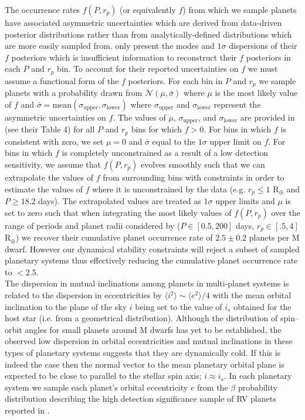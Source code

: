 The occurrence rates $f(P,r_p)$ (or equivalently $f$) from which we sample planets have
associated asymmetric uncertainties which are derived from data-driven posterior distributions
rather than from analytically-defined distributions which are more easily sampled from. \cite{dressing15a}
only present the modes and $1\sigma$ dispersions of their $f$ posteriors which is insufficient information
to reconstruct their $f$ posteriors in each $P$ and $r_p$ bin. To account for their reported uncertainties on
$f$ we must assume a functional form of the $f$ posteriors.
For each bin in $P$ and $r_p$ we sample planets with a probability drawn
from $\mathcal{N}(\mu, \bar{\sigma})$ where $\mu$ is the most likely value
of $f$ and $\bar{\sigma} = \text{mean}(\sigma_{\text{upper}},\sigma_{\text{lower}})$ where
$\sigma_{\text{upper}}$ and $\sigma_{\text{lower}}$ represent the asymmetric uncertainties on $f$.
The values of $\mu$, $\sigma_{\text{upper}}$, and $\sigma_{\text{lower}}$ are provided in \cite{dressing15a}
(see their Table 4) for all $P$ and $r_p$ bins for which $f>0$. For bins in which $f$ is consistent with zero,
we set $\mu=0$ and $\bar{\sigma}$ equal to the $1\sigma$ upper limit on $f$. For bins in
which $f$ is completely unconstrained as a result of a low detection sensitivity, we assume that $f(P,r_p)$ 
evolves smoothly such that we can extrapolate the values of $f$ from surrounding
bins with constraints in order to estimate the values of $f$ where it is unconstrained by the data
(e.g. $r_p \leq 1$ R$_{\oplus}$ and $P \geq 18.2$ days).
The extrapolated values are treated as $1\sigma$ upper limits and $\mu$ is set to zero such that when
integrating the most likely values of
$f(P,r_p)$ over the range of periods and planet radii considered by \citealt{dressing15a} ($P \in [0.5,200]$ days,
$r_p \in [.5,4]$ R$_{\oplus}$) we recover their cumulative
planet occurrence rate of $2.5 \pm 0.2$ planets per M dwarf. However our dynamical stability constraints will
reject a subset of sampled planetary systems thus effectively reducing the cumulative planet occurrence rate to
$<2.5$. \\

The dispersion in mutual inclinations among planets in multi-planet 
systems is related to the dispersion in eccentricities by $\langle i^2 \rangle \sim \langle e^2 \rangle /4$ 
\citep{stewart00, quillen07} with the mean orbital inclination 
to the plane of the sky $i$ being set to the value of $i_s$ obtained for the host star (i.e. from a geometrical
distribution). Although the distribution of spin--orbit angles for small planets around
M dwarfs has yet to be established, the observed low dispersion in orbital eccentricities \citep{vaneylen15}
and mutual inclinations \citep{figueira12, fabrycky14} in these types of planetary systems suggests that
they are dynamically cold. If this is indeed the case then the normal vector
to the mean planetary orbital plane is expected to be close to parallel to the stellar spin axis; $i \approx i_s$.
In each planetary system we sample each planet's orbital eccentricity $e$ from the $\beta$ probability
distribution describing the high detection significance sample of RV planets reported in \cite{cloutier15}
\citep[see also ][]{kipping13}. 

